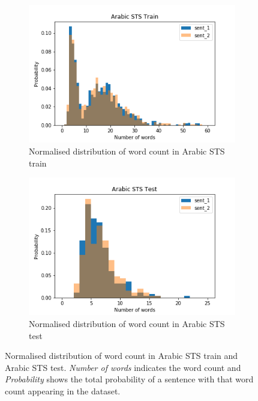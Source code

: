 \begin{enumerate}
\begin{figure}
	\captionsetup[subfigure]{justification=centering}
	\centering
	\begin{subfigure}[b]{.5\textwidth}
		\centering
		\includegraphics[width=\textwidth]{figures/semantic_textual_similarity/introduction/arabic_sts_train_words.png}
		\caption{Normalised distribution of word count in Arabic STS train}
		\label{fig:arabic_sts_train_words}
	\end{subfigure}%
	\begin{subfigure}[b]{.5\textwidth}
		\centering
		\includegraphics[width=\textwidth]{figures/semantic_textual_similarity/introduction/arabic_sts_test_words.png}
		\caption{Normalised distribution of word count in Arabic STS test}
		\label{fig:arabic_sts_test_words}
	\end{subfigure}
	\caption[Normalised distribution of word count in Arabic STS train and Arabic STS test.]{Normalised distribution of word count in Arabic STS train and Arabic STS test. \textit{Number of words} indicates the word count and \textit{Probability} shows the total probability of a sentence with that word count appearing in the dataset.}
	\label{fig:arabic_sts_words}
\end{figure}


\end{enumerate}
